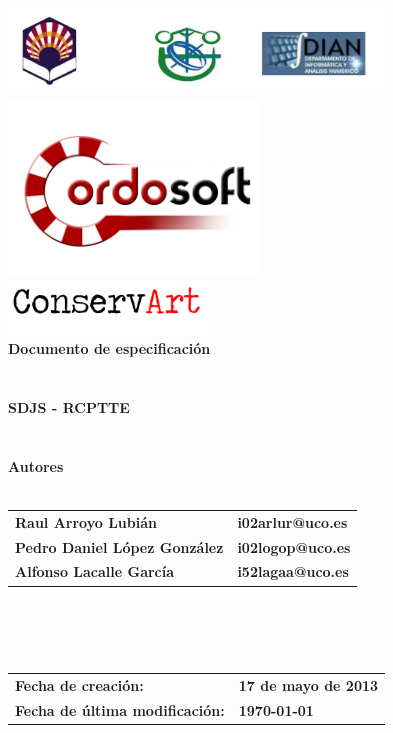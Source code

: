 \documentclass[a4paper,11pt]{article}
\begin{document}
	\begin{titlepage}
		\begin{center}
			\includegraphics[width=375px]{Universidad.png} \\
            \includegraphics[width=250px]{logo_cordosoft.png} \\
            \includegraphics[width=200px]{conservart_logo.png} \\
			\textbf{\LARGE Documento de especificación} \\
			\\
			\textbf{}
			\\
			\textbf{\Large SDJS - RCPTTE} \\
			\\
			\textbf{}
			\\
			\textbf{Autores}
			\\
			\textbf{}
			\\
			\begin{tabular}{l l}
				\textbf{Raul Arroyo Lubián} & \textbf{i02arlur@uco.es} \\	
				\textbf{Pedro Daniel López González} & \textbf{i02logop@uco.es} \\
				\textbf{Alfonso Lacalle García} & \textbf{i52lagaa@uco.es} \\
			\end{tabular}
			\\
			\textbf{}
			\\
			\textbf{}
			\\
			\begin{tabular}{l l}
				\textbf{Fecha de creación:} & \textbf{17 de mayo de 2013} \\
				\textbf{Fecha de última modificación:} & \textbf{\today } \\
			\end{tabular}
		\end{center}
    \end{titlepage}
\end{document}
